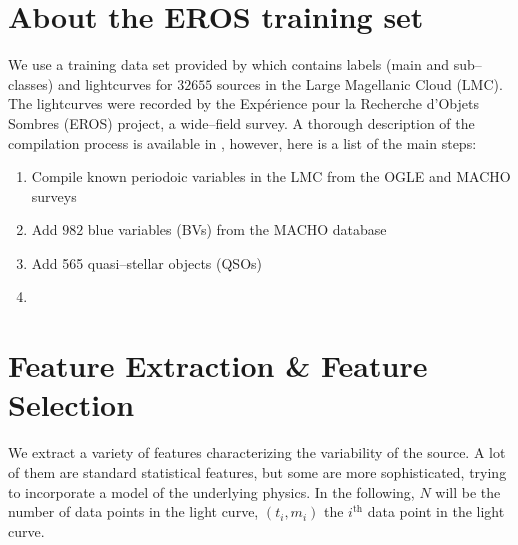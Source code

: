 \section{About the EROS training set}

We use a training data set provided by \citet{kim2014} which contains labels (main and sub--classes) and lightcurves for $32655$ sources in the Large Magellanic Cloud (LMC). The lightcurves were recorded by the Expérience pour la Recherche d’Objets Sombres (EROS) project, a wide--field survey. A thorough description of the compilation process is available in \citet{kim2014}, however, here is a list of the main steps:

\begin{enumerate}
\item Compile known periodoic variables in the LMC from the OGLE and MACHO surveys
\item Add $982$ blue variables (BVs) from the MACHO database
\item Add 565 quasi--stellar objects (QSOs)
\item 
\end{enumerate}


\section{Feature Extraction \& Feature Selection}

We extract a variety of features characterizing the variability of the source. A lot of them are standard statistical features, but some are more sophisticated, trying to incorporate a model of the underlying physics. In the following, $N$ will be the number of data points in the light curve, $(t_i, m_i)$ the $i^{\text{th}}$ data point in the light curve.

